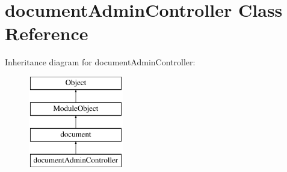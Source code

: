 \hypertarget{classdocumentAdminController}{\section{document\-Admin\-Controller Class Reference}
\label{classdocumentAdminController}
}
Inheritance diagram for document\-Admin\-Controller\-:\begin{figure}[H]
\begin{center}
\leavevmode
\includegraphics[height=4.000000cm]{classdocumentAdminController}
\end{center}
\end{figure}
